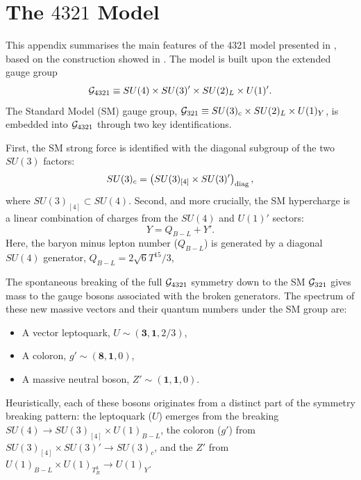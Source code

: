 \chapter{The $4321$ Model}
\label{sec:4321}

This appendix summarises the main features of the 4321 model presented in \cite{DiLuzio:2017vat}, based on the construction showed in \cite{DiLuzio2018}. The model is built upon the extended gauge group
\[
\mathcal{G}_{\rm 4321} \equiv SU(4) \times SU(3)' \times SU(2)_L \times U(1)'.
\]
The Standard Model (SM) gauge group, $\mathcal{G}_{\rm 321} \equiv SU(3)_c \times SU(2)_L \times U(1)_Y$, is embedded into $\mathcal{G}_{\rm 4321}$ through two key identifications.

First, the SM strong force is identified with the diagonal subgroup of the two $SU(3)$ factors:
\begin{equation}
SU(3)_c = \left( SU(3)_{[4]} \times SU(3)' \right)_{\rm diag},
\end{equation}
where $SU(3)_{[4]} \subset SU(4)$. Second, and more crucially, the SM hypercharge is a linear combination of charges from the $SU(4)$ and $U(1)'$ sectors:
\begin{equation}
Y = Q_{B-L} + Y'.
\end{equation}
Here, the baryon minus lepton number ($Q_{B-L}$) is generated by a diagonal $SU(4)$ generator, $Q_{B-L} = 2\sqrt{6} T^{15}/3$, 


The spontaneous breaking of the full $\mathcal{G}_{\rm 4321}$ symmetry down to the SM $\mathcal{G}_{\rm 321}$ gives mass to the gauge bosons associated with the broken generators. The spectrum of these new massive vectors and their quantum numbers under the SM group are:
\begin{itemize}
    \item A vector leptoquark, $U \sim (\mathbf{3},\mathbf{1},2/3)$,
    \item A coloron, $g' \sim (\mathbf{8},\mathbf{1},0)$,
    \item A massive neutral boson, $Z' \sim (\mathbf{1},\mathbf{1},0)$.
\end{itemize}
Heuristically, each of these bosons originates from a distinct part of the symmetry breaking pattern: the leptoquark ($U$) emerges from the breaking $SU(4)\to SU(3)_{[4]}\times U(1)_{B-L}$, the coloron ($g'$) from $SU(3)_{[4]}\times SU(3)'\to SU(3)_c$, and the $Z'$ from $U(1)_{B-L}\times U(1)_{T_R^3}\to U(1)_Y$.


